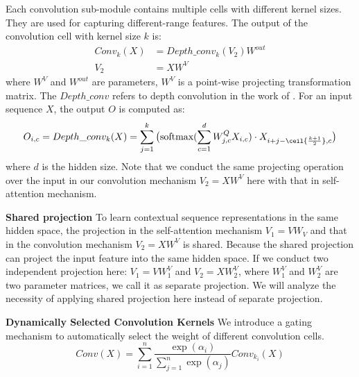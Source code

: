 \documentclass{article} %
\begin{document}
Each convolution sub-module contains multiple cells with different kernel sizes. They are used for capturing different-range features. The output of the convolution cell with kernel size $k$ is:
\begin{equation}
\begin{split}
    Conv_{k}(X) &= Depth\_conv_{k}(V_2)W^{out} \\
     V_2 &= XW^{V}
\end{split}
\end{equation}
where $W^{V}$ and $W^{out}$ are parameters, $W^{V}$ is a point-wise projecting transformation matrix. The $Depth\_conv$ refers to depth convolution in the work of  \citet{wu2019pay}. For an input sequence $X$, the output $O$ is computed as: 
\begin{equation}
    O_{i,c} = Depth\_conv_{k}(X) = \sum\limits_{j=1}^{k} \big( \text{softmax} (\sum\limits_{c=1}^d W_{j,c}^Q X_{i,c})  \cdot X_{i+j-\ceil{\frac{k+1}{2}}, c} \big)
\end{equation}
where $d$ is the hidden size.
Note that we conduct the same projecting operation over the input in our convolution mechanism $V_2=XW^V$ here with that in self-attention mechanism. 

\textbf{Shared projection}
To learn contextual sequence representations in the same hidden space, the projection in the self-attention mechanism $V_1=VW_V$ and that in the convolution mechanism $V_2=XW^V$ is shared. Because the shared projection can project the input feature into the same hidden space. If we conduct two independent projection here: $V_1=VW_1^V$ and $V_2=XW^V_2$, where $W_1^V$ and $W_2^V$ are two parameter matrices, we call it as separate projection. We will analyze the necessity of applying shared projection here instead of separate projection.

\textbf{Dynamically Selected Convolution Kernels}
 We introduce a gating mechanism to automatically select the weight of different convolution cells. 
\begin{equation}
    Conv(X) = \sum\limits_{i=1}^{n} \frac{\exp{(\alpha_i)} }{\sum\limits_{j=1}^{n}\exp{(\alpha_j)}} {Conv_{k_{i}}(X)}
\end{equation}

\end{document}
